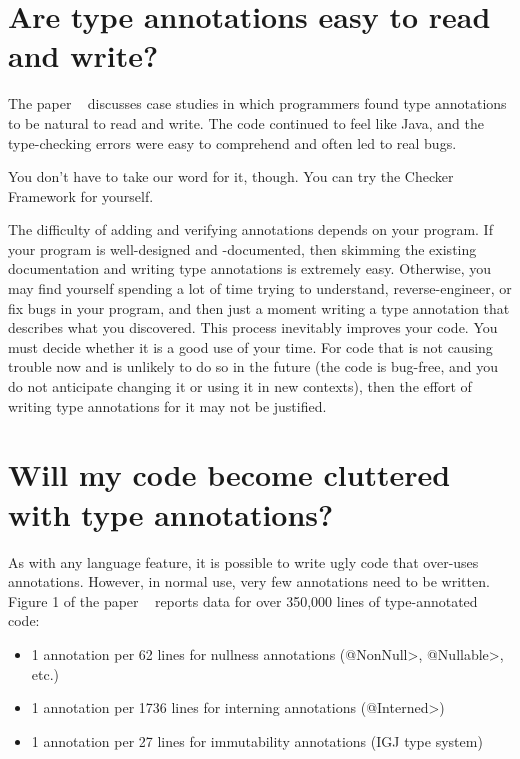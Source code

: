 \section{Are type annotations easy to read and write?\label{faq-ease-of-use}}

The paper
~\cite{PapiACPE2008} discusses case studies in
which programmers
found type annotations to be natural to read and write.  The code
continued to feel like Java, and the type-checking errors were easy to
comprehend and often led to real bugs.

You don't have to take our word for it, though.  You can try the
Checker Framework for yourself.

The difficulty of adding and verifying annotations depends on your program.
If your program is well-designed and -documented, then skimming the
existing documentation and writing type annotations is extremely easy.
Otherwise, you may find yourself spending a lot of time trying to
understand, reverse-engineer, or fix bugs in your program, and then just a
moment writing a type annotation that describes what you discovered.  This
process inevitably improves your code.  You must decide whether it is a
good use of your time.  For code that is not causing trouble now and is
unlikely to do so in the future (the code is bug-free, and you do not
anticipate changing it or using it in new contexts), then the
effort of writing type annotations for it may not be justified.


\section{Will my code become cluttered with type annotations?\label{faq-code-clutter}}


As with any language feature, it is possible to write ugly code that
over-uses annotations.  However, in normal use, very few annotations need
to be written.  Figure 1 of the paper
~\cite{PapiACPE2008} reports data for over
350,000 lines of type-annotated code:

\begin{itemize}
\item
    1 annotation per 62 lines for nullness annotations (\<@NonNull>, \<@Nullable>, etc.)
\item
    1 annotation per 1736 lines for interning annotations (\<@Interned>)
\item
    1 annotation per 27 lines for immutability annotations (IGJ type system)
\end{itemize}

